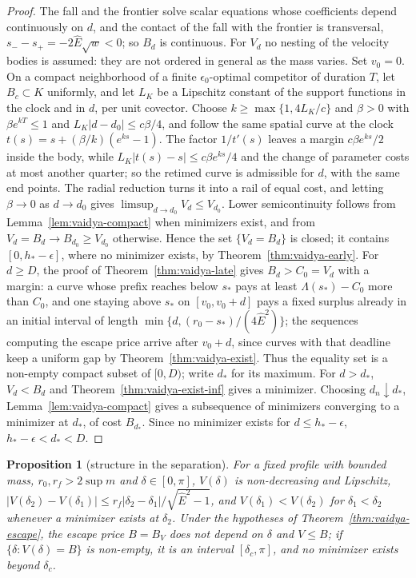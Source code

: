 \documentclass[aip,jmp,amsmath,amssymb,reprint]{revtex4-2}
\newcommand{\Ehat}{\hat E}
\theoremstyle{plain}
\newtheorem{proposition}{Proposition}[section]
\theoremstyle{definition}
\begin{document}
\begin{proof}
The fall and the frontier solve scalar equations whose coefficients depend continuously on $d$, and the
contact of the fall with the frontier is transversal, $s_--s_+=-2\Ehat\sqrt w<0$; so $B_d$ is continuous. For
$V_d$ no nesting of the velocity bodies is assumed: they are not ordered in general as the mass varies.
Set $v_0=0$. On a compact neighborhood of a finite $\epsilon_0$-optimal competitor of duration $T$, let
$B_c\subset K$ uniformly, and let $L_K$ be a Lipschitz constant of the support functions in the clock and in
$d$, per unit covector. Choose $k\ge\max\{1,4L_K/c\}$ and $\beta>0$ with $\beta e^{kT}\le1$ and $L_K|d-d_0|\le c\beta/4$,
and follow the same spatial curve at the clock $t(s)=s+(\beta/k)(e^{ks}-1)$. The factor $1/t'(s)$ leaves a margin
$c\beta e^{ks}/2$ inside the body, while $L_K|t(s)-s|\le c\beta e^{ks}/4$ and the change of parameter costs at most
another quarter; so the retimed curve is admissible for $d$, with the same end points. The radial
reduction turns it into a rail of equal cost, and letting $\beta\to0$ as $d\to d_0$ gives
$\limsup_{d\to d_0}V_d\le V_{d_0}$. Lower semicontinuity follows
from Lemma~\ref{lem:vaidya-compact} when minimizers exist, and from $V_d=B_d\to B_{d_0}\ge V_{d_0}$ otherwise.
Hence the set $\{V_d=B_d\}$ is closed; it contains $[0,h_*-\epsilon]$, where no minimizer exists, by
Theorem~\ref{thm:vaidya-early}. For $d\ge D$, the proof of Theorem~\ref{thm:vaidya-late} gives $B_d>C_0=V_d$ with a
margin: a curve whose prefix reaches below $s_*$ pays at least $\Lambda(s_*)-C_0$ more than $C_0$, and one staying
above $s_*$ on $[v_0,v_0+d]$ pays a fixed surplus already in an initial interval of length
$\min\{d,(r_0-s_*)/(4\Ehat^2)\}$; the sequences computing the escape price arrive after $v_0+d$, since curves with
that deadline keep a uniform gap by Theorem~\ref{thm:vaidya-exist}. Thus the equality set is a non-empty compact
subset of $[0,D)$; write $d_*$ for its maximum. For $d>d_*$, $V_d<B_d$ and Theorem~\ref{thm:vaidya-exist-inf} gives a
minimizer. Choosing $d_n\downarrow d_*$, Lemma~\ref{lem:vaidya-compact} gives a subsequence of minimizers converging
to a minimizer at $d_*$, of cost $B_{d_*}$. Since no minimizer exists for $d\le h_*-\epsilon$, $h_*-\epsilon<d_*<D$.
\end{proof}

\begin{proposition}[structure in the separation]\label{prop:vaidya-delta}
For a fixed profile with bounded mass, $r_0,r_f>2\sup m$ and $\delta\in[0,\pi]$, $V(\delta)$ is non-decreasing and Lipschitz,
$|V(\delta_2)-V(\delta_1)|\le r_f|\delta_2-\delta_1|/\sqrt{\Ehat^2-1}$, and $V(\delta_1)<V(\delta_2)$ for $\delta_1<\delta_2$ whenever a
minimizer exists at $\delta_2$. Under the hypotheses of Theorem~\ref{thm:vaidya-escape}, the escape price $B=B_V$ does not depend on $\delta$ and
$V\le B$; if $\{\delta:V(\delta)=B\}$ is non-empty, it is an interval $[\delta_c,\pi]$, and no minimizer exists beyond
$\delta_c$.
\end{proposition}
\end{document}
